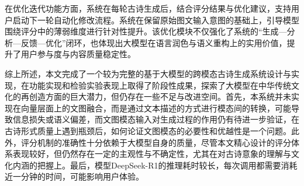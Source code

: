 在优化迭代功能方面，系统在每轮古诗生成后，结合评分结果与优化建议，支持用户启动下一轮自动化修改流程。系统在保留原始图文输入意图的基础上，引导模型围绕评分中的薄弱维度进行针对性提升。该优化模块不仅强化了系统的“生成—分析—反馈—优化”闭环，也体现出大模型在语言润色与语义重构上的实用价值，提升了用户参与度与内容质量稳定性。

综上所述，本文完成了一个较为完整的基于大模型的跨模态古诗生成系统设计与实现，在功能实现和检验实验表现上取得了阶段性成果，探索了大模型在中华传统文化的再创造方面的巨大潜力，但仍存在一些不足与改进空间。首先，本系统并未实现在向量层面上的文图融合，而是通过文本描述的方式进行模态间的转换，可能导致信息损失或语义偏差，而文图模态输入对生成过程的作用仍有待进一步验证，在古诗形式质量上遇到瓶颈后，如何论证文图模态的必要性和优越性是一个问题。此外，评分机制的准确性十分依赖于大模型自身的质量，尽管本文精心设计的评分体系表现较好，但仍然存在一定的主观性与不确定性，尤其在对古诗意象的理解与文化内涵的把握上。最后，模型DeepSeek-R1的推理耗时较长，每次调用都需要消耗近一分钟的时间，可能影响用户体验。


